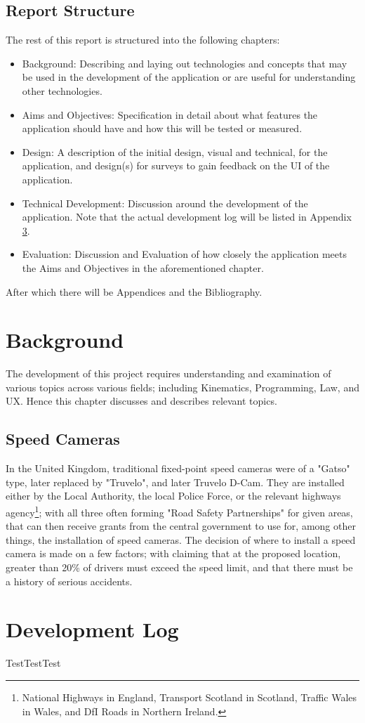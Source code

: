 \documentclass[11pt, a4paper, notitlepage]{report}
\begin{document}
\section{Report Structure}
The rest of this report is structured into the following chapters:
\begin{itemize}
	\item Background: Describing and laying out technologies and concepts that may be used in the development of the application or are useful for understanding other technologies.
	\item Aims and Objectives: Specification in detail about what features the application should have and how this will be tested or measured.
	\item Design: A description of the initial design, visual and technical, for the application, and design(s) for surveys to gain feedback on the UI of the application.
	\item Technical Development: Discussion around the development of the application. Note that the actual development log will be listed in Appendix \ref{app:GitLog}.
    \item Evaluation: Discussion and Evaluation of how closely the application meets the Aims and Objectives in the aforementioned chapter.
\end{itemize}
After which there will be Appendices and the Bibliography. %
\chapter{Background}
The development of this project requires understanding and examination of various topics across various fields; including Kinematics, Programming, Law, and UX. Hence this chapter discusses and describes relevant topics.
\section{Speed Cameras}
In the United Kingdom, traditional fixed-point speed cameras were of a "Gatso" type, later replaced by "Truvelo", and later Truvelo D-Cam. They are installed either by the Local Authority, the local Police Force, or the relevant highways agency\footnote{National Highways in England, Transport Scotland in Scotland, Traffic Wales in Wales, and DfI Roads in Northern Ireland.}; with all three often forming "Road Safety Partnerships" for given areas, that can then receive grants from the central government \citep{RSPGrantDetails} to use for, among other things, the installation of speed cameras. The decision of where to install a speed camera is made on a few factors; with \citet{SpeedCameraInstalltion} claiming that at the proposed location, greater than 20\% of drivers must exceed the speed limit, and that there must be a history of serious accidents.



\appendix
\chapter{Development Log}\label{app:GitLog}
TestTestTest


\end{document}
